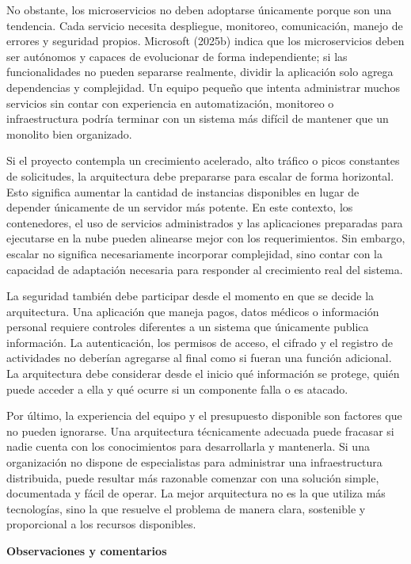 \documentclass[12pt,letterpaper]{article}
\begin{document}
No obstante, los microservicios no deben adoptarse únicamente porque son una tendencia. Cada servicio necesita despliegue, monitoreo, comunicación, manejo de errores y seguridad propios. Microsoft (2025b) indica que los microservicios deben ser autónomos y capaces de evolucionar de forma independiente; si las funcionalidades no pueden separarse realmente, dividir la aplicación solo agrega dependencias y complejidad. Un equipo pequeño que intenta administrar muchos servicios sin contar con experiencia en automatización, monitoreo o infraestructura podría terminar con un sistema más difícil de mantener que un monolito bien organizado.

Si el proyecto contempla un crecimiento acelerado, alto tráfico o picos constantes de solicitudes, la arquitectura debe prepararse para escalar de forma horizontal. Esto significa aumentar la cantidad de instancias disponibles en lugar de depender únicamente de un servidor más potente. En este contexto, los contenedores, el uso de servicios administrados y las aplicaciones preparadas para ejecutarse en la nube pueden alinearse mejor con los requerimientos. Sin embargo, escalar no significa necesariamente incorporar complejidad, sino contar con la capacidad de adaptación necesaria para responder al crecimiento real del sistema.

La seguridad también debe participar desde el momento en que se decide la arquitectura. Una aplicación que maneja pagos, datos médicos o información personal requiere controles diferentes a un sistema que únicamente publica información. La autenticación, los permisos de acceso, el cifrado y el registro de actividades no deberían agregarse al final como si fueran una función adicional. La arquitectura debe considerar desde el inicio qué información se protege, quién puede acceder a ella y qué ocurre si un componente falla o es atacado.

Por último, la experiencia del equipo y el presupuesto disponible son factores que no pueden ignorarse. Una arquitectura técnicamente adecuada puede fracasar si nadie cuenta con los conocimientos para desarrollarla y mantenerla. Si una organización no dispone de especialistas para administrar una infraestructura distribuida, puede resultar más razonable comenzar con una solución simple, documentada y fácil de operar. La mejor arquitectura no es la que utiliza más tecnologías, sino la que resuelve el problema de manera clara, sostenible y proporcional a los recursos disponibles.


\textbf{Observaciones y comentarios}
\end{document}

